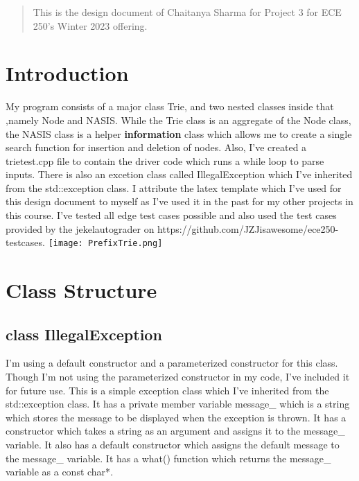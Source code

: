 \begin{center}
	\begin{abstract}
		This is the design document of Chaitanya Sharma for Project 3 for ECE 250's Winter 2023 offering.
	\end{abstract}
\end{center}

\section{Introduction}
My program consists of a major class {\color{draculapurple}Trie}, and two nested classes inside that ,namely {\color{draculapurple}Node} and
	{\color{draculapurple}NASIS}.
	While the {\color{draculapurple}Trie} class is an aggregate of the {\color{draculapurple}Node} class, the {\color{draculapurple}NASIS} class is a helper {\textbf{information}} class which allows me to create a single search function for insertion and deletion of nodes.
Also, I've created a {\color{draculayellow}trietest.cpp} file to contain the driver code which runs a while loop to parse inputs. There is also an excetion class called {\color{draculapurple}IllegalException} which I've inherited from the {\color{draculapurple}std::exception} class.
I attribute the latex template which I've used for this design document to myself as I've used it in the past for my other projects in this course.
\newline I've tested all edge test cases possible and also used the test cases provided by the
jekelautograder on {\color{DarkPastelBlue}https://github.com/JZJisawesome/ece250-testcases}.
\newline
\texttt{[image: PrefixTrie.png]}
\section{Class Structure}



\subsection{{\color{orange}class} {\Large{\color{draculapurple}IllegalException}}}
I'm using a default constructor and a parameterized constructor for this class. Though I'm not using the parameterized constructor in my code, I've included it for future use.
This is a simple exception class which I've inherited from the {\color{draculapurple}std::exception} class. 
It has a private member variable {\color{Turquoise}message\_} which is a string which stores the message to be 
displayed when the exception is thrown. It has a constructor which takes a string as an argument and assigns it 
to the {\color{Turquoise}message\_} variable. It also has a default constructor which assigns the default 
message to the {\color{Turquoise}message\_} variable. It has a {\color{draculapurple}what()} function which returns 
the {\color{Turquoise}message\_} variable as a {\color{draculapurple}const char*}.

